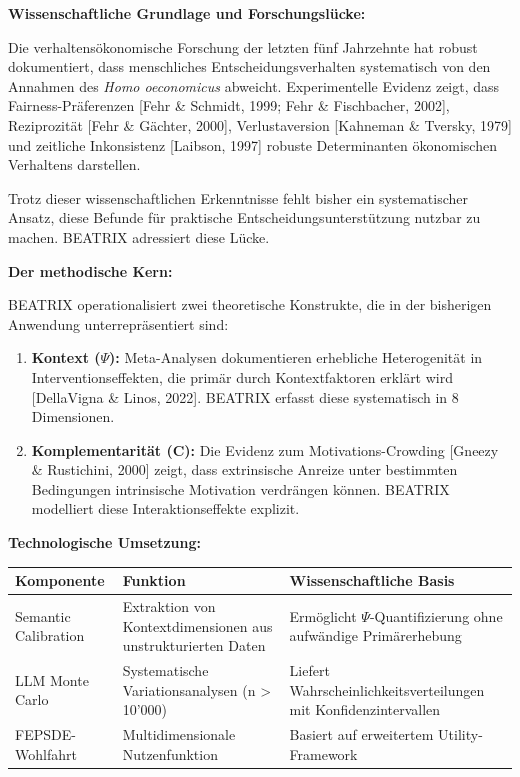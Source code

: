 \documentclass[11pt,a4paper]{article}
\newcommand{\evidence}[1]{\textcolor{fehrgray}{[#1]}}
\begin{document}
\textbf{Wissenschaftliche Grundlage und Forschungslücke:}

Die verhaltensökonomische Forschung der letzten fünf Jahrzehnte hat robust dokumentiert, dass menschliches Entscheidungsverhalten systematisch von den Annahmen des \textit{Homo oeconomicus} abweicht. Experimentelle Evidenz zeigt, dass Fairness-Präferenzen \evidence{Fehr \& Schmidt, 1999; Fehr \& Fischbacher, 2002}, Reziprozität \evidence{Fehr \& Gächter, 2000}, Verlustaversion \evidence{Kahneman \& Tversky, 1979} und zeitliche Inkonsistenz \evidence{Laibson, 1997} robuste Determinanten ökonomischen Verhaltens darstellen.

Trotz dieser wissenschaftlichen Erkenntnisse fehlt bisher ein systematischer Ansatz, diese Befunde für praktische Entscheidungsunterstützung nutzbar zu machen. BEATRIX adressiert diese Lücke.

\textbf{Der methodische Kern:}

BEATRIX operationalisiert zwei theoretische Konstrukte, die in der bisherigen Anwendung unterrepräsentiert sind:

\begin{enumerate}[leftmargin=2em]
    \item \textbf{Kontext ($\Psi$):} Meta-Analysen dokumentieren erhebliche Heterogenität in Interventionseffekten, die primär durch Kontextfaktoren erklärt wird \evidence{DellaVigna \& Linos, 2022}. BEATRIX erfasst diese systematisch in 8 Dimensionen.

    \item \textbf{Komplementarität (C):} Die Evidenz zum Motivations-Crowding \evidence{Gneezy \& Rustichini, 2000} zeigt, dass extrinsische Anreize unter bestimmten Bedingungen intrinsische Motivation verdrängen können. BEATRIX modelliert diese Interaktionseffekte explizit.
\end{enumerate}

\textbf{Technologische Umsetzung:}

\begin{table}[h]
\centering
\begin{tabular}{@{}L{3.5cm}L{5cm}L{5cm}@{}}
\toprule
\textbf{Komponente} & \textbf{Funktion} & \textbf{Wissenschaftliche Basis} \\
\midrule
Semantic Calibration & Extraktion von Kontextdimensionen aus unstrukturierten Daten & Ermöglicht $\Psi$-Quantifizierung ohne aufwändige Primärerhebung \\
LLM Monte Carlo & Systematische Variationsanalysen (n > 10'000) & Liefert Wahrscheinlichkeitsverteilungen mit Konfidenzintervallen \\
FEPSDE-Wohlfahrt & Multidimensionale Nutzenfunktion & Basiert auf erweitertem Utility-Framework \\
\bottomrule
\end{tabular}
\end{table}
\end{document}

